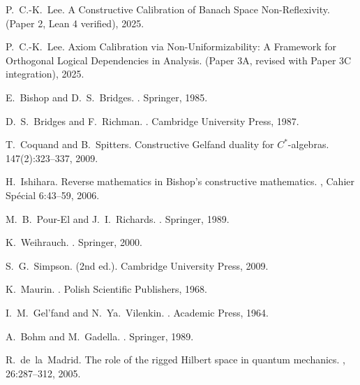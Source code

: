 \documentclass[11pt]{article}
\theoremstyle{plain}
\theoremstyle{definition}
\theoremstyle{remark}
\begin{document}

\begin{thebibliography}{99}

P.~C.-K.~Lee.
\newblock A Constructive Calibration of Banach Space Non-Reflexivity.
\newblock (Paper 2, Lean 4 verified), 2025.

P.~C.-K.~Lee.
\newblock Axiom Calibration via Non-Uniformizability: A Framework for Orthogonal Logical Dependencies in Analysis.
\newblock (Paper 3A, revised with Paper 3C integration), 2025.

E.~Bishop and D.~S.~Bridges.
.
\newblock Springer, 1985.

D.~S.~Bridges and F.~Richman.
.
\newblock Cambridge University Press, 1987.

T.~Coquand and B.~Spitters.
\newblock Constructive Gelfand duality for $C^*$-algebras.
 147(2):323--337, 2009.

H.~Ishihara.
\newblock Reverse mathematics in {B}ishop's constructive mathematics.
, Cahier Sp\'ecial 6:43--59, 2006.

M.~B.~Pour-El and J.~I.~Richards.
.
\newblock Springer, 1989.

K.~Weihrauch.
.
\newblock Springer, 2000.

S.~G.~Simpson.
 (2nd ed.).
\newblock Cambridge University Press, 2009.

K.~Maurin.
.
\newblock Polish Scientific Publishers, 1968.

I.~M.~Gel'fand and N.~Ya.~Vilenkin.
.
\newblock Academic Press, 1964.

A.~Bohm and M.~Gadella.
.
\newblock Springer, 1989.

R.~de~la~Madrid.
\newblock The role of the rigged Hilbert space in quantum mechanics.
, 26:287--312, 2005.

\end{thebibliography}
\end{document}
